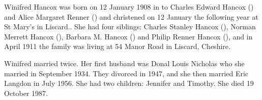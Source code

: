 
Winifred Hancox was born on 12 January 1908 in \cite{BMD1907} to Charles Edward Hancox () and Alice Margaret Renner () \cite{WHancoxBirth} and christened on 12 January the following year at St Mary's in Liscard.\cite{ParishReg}. She had four siblings: Charles Stanley Hancox (), Norman Merrett Hancox (), Barbara M. Hancox () and Philip Renner Hancox (), and in April 1911 the family was living at 54 Manor Road in Liscard, Cheshire.\cite{1911Census}

Winifred married twice.  Her first husband was Donal Louis Nicholas who she married in September 1934.  They divorced in 1947, and she then married Eric Langdon in July 1956.  She had two children: Jennifer and Timothy.
She died 19 October 1987.

